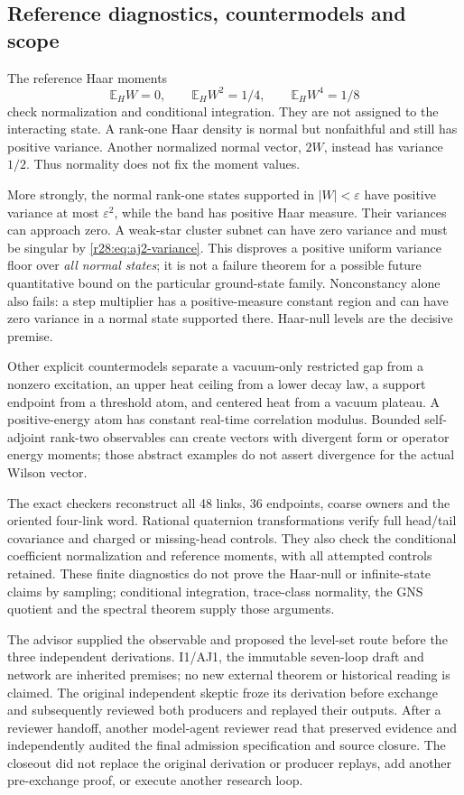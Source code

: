 \subsection{Reference diagnostics, countermodels and scope}
The reference Haar moments
\begin{equation}
 \mathbb E_H W=0,\qquad\mathbb E_H W^2=1/4,
 \qquad\mathbb E_H W^4=1/8
\end{equation}
check normalization and conditional integration. They are not assigned to the interacting state. A rank-one Haar density is normal but nonfaithful and still has positive variance. Another normalized normal vector, $2W$, instead has variance $1/2$. Thus normality does not fix the moment values.

More strongly, the normal rank-one states supported in $|W|<\varepsilon$ have positive variance at most $\varepsilon^2$, while the band has positive Haar measure. Their variances can approach zero. A weak-star cluster subnet can have zero variance and must be singular by \eqref{r28:eq:aj2-variance}. This disproves a positive uniform variance floor over \emph{all normal states}; it is not a failure theorem for a possible future quantitative bound on the particular ground-state family. Nonconstancy alone also fails: a step multiplier has a positive-measure constant region and can have zero variance in a normal state supported there. Haar-null levels are the decisive premise.

Other explicit countermodels separate a vacuum-only restricted gap from a nonzero excitation, an upper heat ceiling from a lower decay law, a support endpoint from a threshold atom, and centered heat from a vacuum plateau. A positive-energy atom has constant real-time correlation modulus. Bounded self-adjoint rank-two observables can create vectors with divergent form or operator energy moments; those abstract examples do not assert divergence for the actual Wilson vector.

The exact checkers reconstruct all 48 links, 36 endpoints, coarse owners and the oriented four-link word. Rational quaternion transformations verify full head/tail covariance and charged or missing-head controls. They also check the conditional coefficient normalization and reference moments, with all attempted controls retained. These finite diagnostics do not prove the Haar-null or infinite-state claims by sampling; conditional integration, trace-class normality, the GNS quotient and the spectral theorem supply those arguments.

The advisor supplied the observable and proposed the level-set route before the three independent derivations. I1/AJ1, the immutable seven-loop draft and network are inherited premises; no new external theorem or historical reading is claimed. The original independent skeptic froze its derivation before exchange and subsequently reviewed both producers and replayed their outputs. After a reviewer handoff, another model-agent reviewer read that preserved evidence and independently audited the final admission specification and source closure. The closeout did not replace the original derivation or producer replays, add another pre-exchange proof, or execute another research loop.


